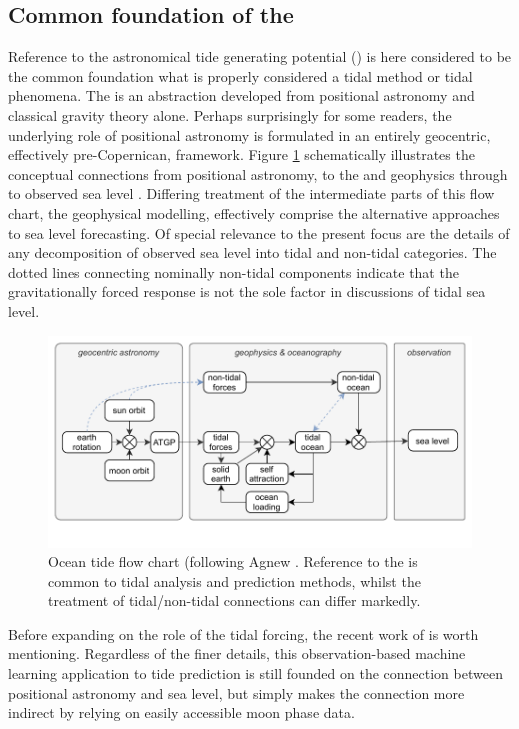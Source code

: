 \subsection{Common foundation of the \ATGP{}}
Reference to the astronomical tide generating potential (\ATGP{}) is here considered to be the common foundation what is properly considered a tidal method or tidal phenomena.  
The \ATGP{} is an abstraction developed from positional astronomy and classical gravity theory alone.   Perhaps surprisingly for some readers, the underlying role of positional astronomy is formulated in an entirely geocentric, effectively pre-Copernican, framework. 
Figure \ref{fig:tideForceFlow} schematically illustrates the conceptual connections from positional astronomy, to the \ATGP{} and geophysics through to observed sea level .  
Differing treatment of the intermediate parts of this flow chart, the geophysical modelling, effectively comprise the alternative approaches to sea level forecasting.  Of special relevance to the present focus are the details of any decomposition of observed sea level into tidal and non-tidal categories.   The dotted lines connecting nominally non-tidal components indicate that the gravitationally forced response is not the sole factor in discussions of tidal sea level. 
\begin{figure}[h]
    \begin{center}
    \includegraphics[width=\figwidthFull]{figures/diagrams/tidal_force_flowchart.pdf}
    \caption{Ocean tide flow chart (following Agnew \citep{10.1016/b978-0-444-53802-4.00058-0}.  Reference to the \ATGP{} is common to tidal analysis and prediction methods, whilst the treatment of tidal/non-tidal connections can differ markedly.}
    \label{fig:tideForceFlow}
    \end{center}
\end{figure}
Before expanding on the role of the tidal forcing, the recent work of \cite{10.1016/j.oceaneng.2020.107013} is worth mentioning.   Regardless of the finer details, this observation-based machine learning application to tide prediction is still founded on the connection between positional astronomy and sea level, but simply makes the connection more indirect by relying on easily accessible moon phase data.
